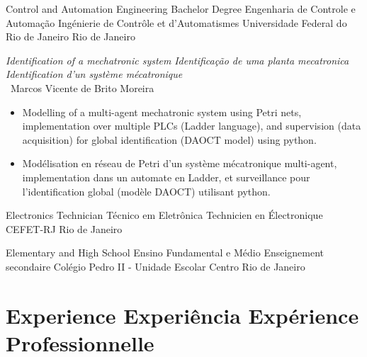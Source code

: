 \cventry{\apr\ 2013\newline \aug\ 2019\newline}
{
  \ml%
  {Control and Automation Engineering Bachelor Degree}
  {Engenharia de Controle e Automação}
  {Ingénierie de Contrôle et d'Automatismes}}
{\newline Universidade Federal do Rio de Janeiro}
{Rio de Janeiro}{\brazil}
{
  \ml
  {\emph{Identification of a mechatronic system}}
  {\emph{Identificação de uma planta mecatronica}}
  {\emph{Identification d'un système mécatronique}}%
  \\
  \supervisor\ Marcos Vicente de Brito Moreira
  \ml
  {
    \begin{itemize}
      \item Modelling of a multi-agent mechatronic system using Petri nets, implementation over multiple PLCs (Ladder language), and supervision (data acquisition) for global identification (DAOCT model) using python.
    \end{itemize}
  }
  {}
  {
    \begin{itemize}
    \item Modélisation en réseau de Petri d'un système mécatronique multi-agent, implementation dans un automate en Ladder, et surveillance pour l'identification global (modèle DAOCT) utilisant python.
  \end{itemize}
  }
}

\cventry{\apr\ 2010\newline \dec\ 2012\newline}
{
  \ml%
  {Electronics Technician}
  {Técnico em Eletrônica}
  {Technicien en Électronique}}
{\newline CEFET-RJ}
{Rio de Janeiro}{\brazil}{}

\cventry{\apr\ 2006\newline \dec\ 2012\newline}
{
  \ml
  {Elementary and High School}
  {Ensino Fundamental e Médio}
  {Enseignement secondaire}%
}
{\newline Colégio Pedro II - Unidade Escolar Centro}
{Rio de Janeiro}{\brazil}{}

\section{
  \ml%
  {Experience}
  {Experiência}
  {Expérience Professionnelle}
}

